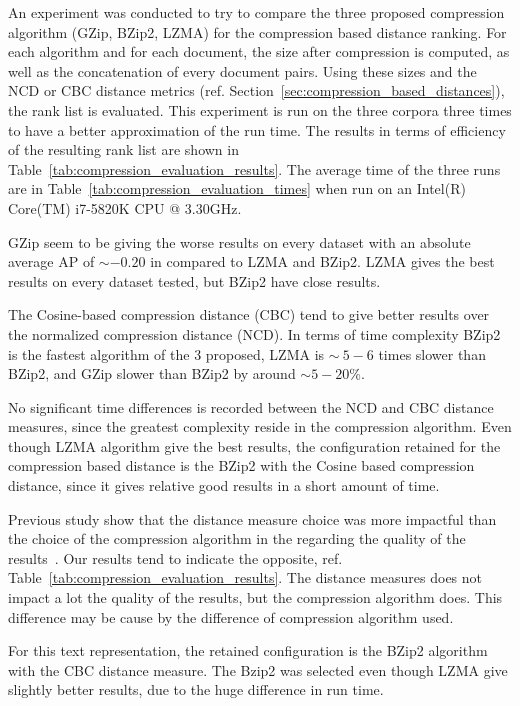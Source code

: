 An experiment was conducted to try to compare the three proposed compression algorithm (GZip, BZip2, LZMA) for the compression based distance ranking.
For each algorithm and for each document, the size after compression is computed, as well as the concatenation of every document pairs.
Using these sizes and the NCD or CBC distance metrics (ref. Section~\ref{sec:compression_based_distances}), the rank list is evaluated.
This experiment is run on the three corpora three times to have a better approximation of the run time.
The results in terms of efficiency of the resulting rank list are shown in Table~\ref{tab:compression_evaluation_results}.
The average time of the three runs are in Table~\ref{tab:compression_evaluation_times} when run on an Intel(R) Core(TM) i7-5820K CPU @ 3.30GHz.

GZip seem to be giving the worse results on every dataset with an absolute average AP of $\sim -0.20$ in compared to LZMA and BZip2.
LZMA gives the best results on every dataset tested, but BZip2 have close results.

The Cosine-based compression distance (CBC) tend to give better results over the normalized compression distance (NCD).
In terms of time complexity BZip2 is the fastest algorithm of the 3 proposed, LZMA is $\sim ~5-6$ times slower than BZip2, and GZip slower than BZip2 by around $\sim 5-20$\%.

No significant time differences is recorded between the NCD and CBC distance measures, since the greatest complexity reside in the compression algorithm.
Even though LZMA algorithm give the best results, the configuration retained for the compression based distance is the BZip2 with the Cosine based compression distance, since it gives relative good results in a short amount of time.

Previous study show that the distance measure choice was more impactful than the choice of the compression algorithm in the regarding the quality of the results~\cite{comparing_compression}.
Our results tend to indicate the opposite, ref. Table~\ref{tab:compression_evaluation_results}.
The distance measures does not impact a lot the quality of the results, but the compression algorithm does.
This difference may be cause by the difference of compression algorithm used.

For this text representation, the retained configuration is the BZip2 algorithm with the CBC distance measure.
The Bzip2 was selected even though LZMA give slightly better results, due to the huge difference in run time.

